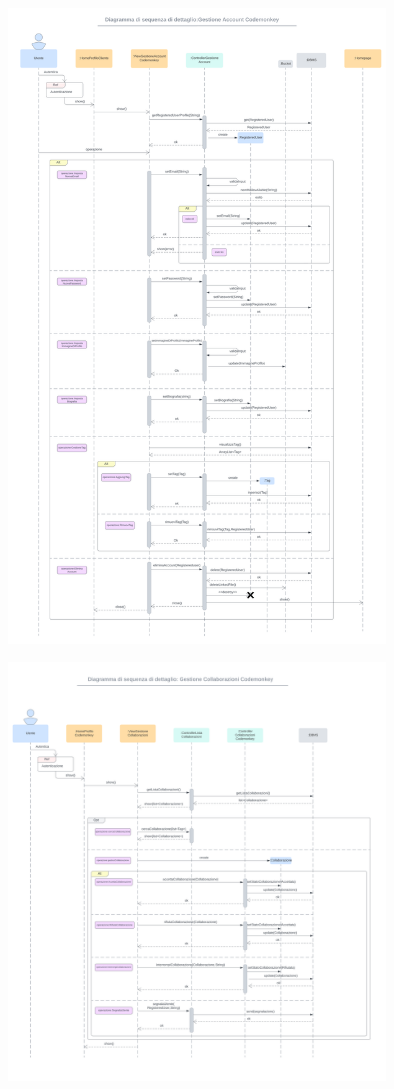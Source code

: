 \includegraphics[width=0.75\textwidth]{assets/img/sequenza_dettaglio/codemonkey-1.png}\\

\newpage

\includegraphics[width=0.75\textwidth]{assets/img/sequenza_dettaglio/codemonkey-2.png}